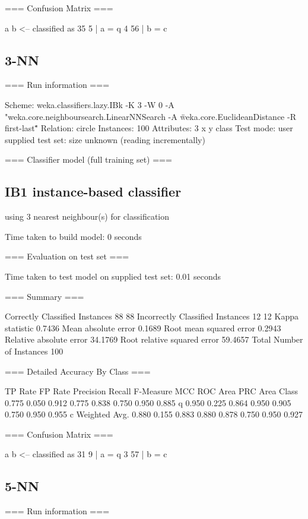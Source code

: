 \documentclass{report}
\begin{document}
	=== Confusion Matrix ===
	
	a  b   <-- classified as
	35  5 |  a = q
	4 56 |  b = c
	
	\subsection{3-NN}
	=== Run information ===
	
	Scheme:       weka.classifiers.lazy.IBk -K 3 -W 0 -A "weka.core.neighboursearch.LinearNNSearch -A \"weka.core.EuclideanDistance -R first-last\""
	Relation:     circle
	Instances:    100
	Attributes:   3
	x
	y
	class
	Test mode:    user supplied test set:  size unknown (reading incrementally)
	
	=== Classifier model (full training set) ===
	
	\subsection{IB1 instance-based classifier}
	using 3 nearest neighbour(s) for classification
	
	
	Time taken to build model: 0 seconds
	
	=== Evaluation on test set ===
	
	Time taken to test model on supplied test set: 0.01 seconds
	
	=== Summary ===
	
	Correctly Classified Instances          88               88      %
	Incorrectly Classified Instances        12               12      %
	Kappa statistic                          0.7436
	Mean absolute error                      0.1689
	Root mean squared error                  0.2943
	Relative absolute error                 34.1769 %
	Root relative squared error             59.4657 %
	Total Number of Instances              100     
	
	=== Detailed Accuracy By Class ===
	
	TP Rate  FP Rate  Precision  Recall   F-Measure  MCC      ROC Area  PRC Area  Class
	0.775    0.050    0.912      0.775    0.838      0.750    0.950     0.885     q
	0.950    0.225    0.864      0.950    0.905      0.750    0.950     0.955     c
	Weighted Avg.    0.880    0.155    0.883      0.880    0.878      0.750    0.950     0.927     
	
	=== Confusion Matrix ===
	
	a  b   <-- classified as
	31  9 |  a = q
	3 57 |  b = c
	
	\subsection{5-NN}
	=== Run information ===
	
\end{document}
